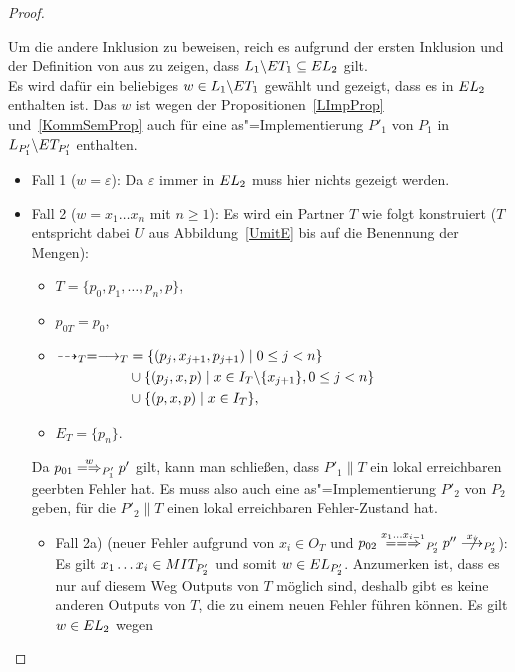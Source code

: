 \begin{proof}
\begin{itemize}
  \end{itemize}
  Um die andere Inklusion zu beweisen, reich es aufgrund der ersten Inklusion
  und der Definition von \EL{} aus zu zeigen, dass $L_1\backslash ET
  _1\subseteq EL _2$ gilt.\\
  Es wird dafür ein beliebiges $w\in L_1\backslash ET _1$ gewählt und gezeigt,
  dass es in $EL _2$ enthalten ist. Das $w$ ist wegen der
  Propositionen~\ref{LImpProp} und~\ref{KommSemProp} auch für eine
  as"=Implementierung $P'_1$ von $P_1$ in $L_{P'_1}\backslash ET _{P'_1}$
  enthalten.
  \begin{itemize}
    \item Fall 1 ($w=\varepsilon$): Da $\varepsilon$ immer in $EL _2$ muss
      hier nichts gezeigt werden.
    \item Fall 2 ($w=x_1\dots x_n$ mit $n\geq 1$): Es wird ein Partner $T$ wie
      folgt konstruiert ($T$ entspricht dabei $U$ aus Abbildung~\ref{UmitE} bis
      auf die Benennung der Mengen):
      \begin{itemize}
        \item $T=\{p_0,p_1,\dots ,p_n,p\}$,
        \item $p_{0T}=p_0$,
        \item $\begin{aligned}[t]
            \may _T = \must _T&=\{(p_j,x_{j+1},p_{j+1})\mid 0\leq j< n\}\\
            &\cup\{(p_j,x,p)\mid x\in I_T\backslash\{x_{j+1}\},0\leq j< n\}\\
            &\cup\{(p,x,p)\mid x\in I_T\},
        \end{aligned}$
        \item $E_T=\{p_n\}$.
      \end{itemize}
      Da $p_{01} \weakmay[w]_{P'_1} p'$ gilt, kann man schließen, dass
      $P'_1\|T$ ein lokal erreichbaren geerbten Fehler hat. Es muss also auch
      eine as"=Implementierung $P'_2$ von $P_2$ geben, für die $P'_2\|T$ einen
      lokal erreichbaren Fehler-Zustand hat.
      \begin{itemize}
        \item Fall 2a) (neuer Fehler aufgrund von $x_i\in O_T$ und $p_{02}
          \lweakmay[x_1\dots x_{i-1}]_{P'_2}p''\nmust[x_i]_{P'_2}$): Es gilt
          $x_1\dots x_i\in MIT _{P'_2}$ und somit $w\in EL _{P'_2}$. Anzumerken
          ist, dass es nur auf diesem Weg Outputs von $T$ möglich sind, deshalb
          gibt es keine anderen Outputs von $T$, die zu einem neuen Fehler
          führen können. Es gilt $w\in EL _2$ wegen

\end{itemize}
\end{itemize}
\end{proof}
